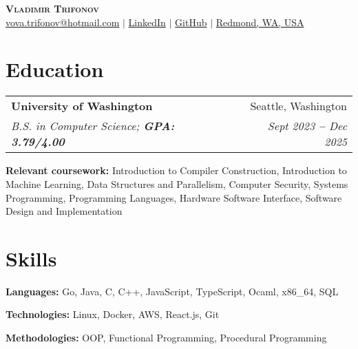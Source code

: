 \documentclass[letterpaper,11pt]{article}
\makeatletter
\newcommand{\resumeEducationHeading}[4]{
  \vspace{-2pt}\item
    \begin{tabular*}{0.97\textwidth}[t]{l@{\extracolsep{\fill}}r}
      \textbf{#1} & #2 \\
      \textit{\small#3} & \textit{\small #4} \\
    \end{tabular*}\vspace{-5pt}
}
\newcommand{\resumeSubHeadingListStart}{\begin{itemize}[leftmargin=0.15in, label={}]}
\newcommand{\resumeSubHeadingListEnd}{\end{itemize}}
\makeatother
\begin{document}

\begin{center}
    \textbf{\Huge \scshape Vladimir Trifonov} \\ \vspace{3pt}
    \small
    \faAt \hspace{.5pt} \href{mailto:vova.trifonov@hotmail.com}{\color{blue}vova.trifonov@hotmail.com}
    $|$
    \faLinkedinSquare \hspace{.5pt} \href{https://www.linkedin.com/in/vladimir-trifonov-a06284220/}{\color{blue}LinkedIn}
    $|$
    \faGithub \hspace{.5pt} \href{https://github.com/Vladimirtrif}{\color{blue}GitHub}
    $|$
    \faMapMarker \hspace{.5pt} \href{https://maps.app.goo.gl/JGq95Uiw7m12e89E8}{\color{blue}Redmond, WA, USA}
\end{center}




\section{Education}
  \vspace{3pt}
  \resumeSubHeadingListStart
    
    \resumeEducationHeading
      {University of Washington} {Seattle, Washington}
      {B.S. in Computer Science;   \textbf{GPA: 3.79/4.00}} {Sept 2023 \textbf{--} Dec 2025}
        \resumeSubHeadingListStart
        \small{\item{
             \textbf{Relevant coursework:} Introduction to Compiler Construction, Introduction to Machine Learning, Data Structures and Parallelism, Computer Security,
              Systems Programming, Programming Languages, Hardware Software Interface, Software Design and Implementation}}
        \resumeSubHeadingListEnd
  \resumeSubHeadingListEnd




\section{Skills}
  \vspace{2pt}
  \resumeSubHeadingListStart
    \small{\item{
        
        \textbf{Languages:}{ Go, Java, C, C++, JavaScript, TypeScript, Ocaml, x86\_64, SQL} \\ \vspace{3pt}
        
        \textbf{Technologies:}{ Linux, Docker, AWS, React.js, Git} \\ \vspace{3pt}
        
        \textbf{Methodologies:}{ OOP, Functional Programming, Procedural Programming} \\ \vspace{3pt}
        
    }}
  \resumeSubHeadingListEnd
\end{document}
